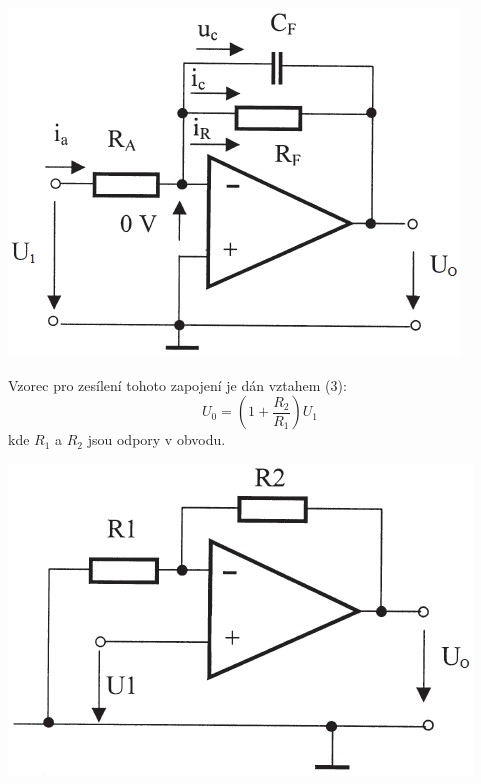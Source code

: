 \documentclass[a4paper,11pt]{article}
\begin{document}
    \begin{minipage}[t]{0.5\textwidth} 
                \vspace{10pt}   
                \par \centering
                \includegraphics[scale=0.6]{low_scheme}
                \captionsetup{justification=centering, font=footnotesize}
                \label{fig:low_scheme}
                \vspace{10pt}
                \raggedright

                \par Vzorec pro zesílení tohoto zapojení je dán vztahem (3):
                \begin{equation}
                    U_0 = \left(1 + \frac{R_2}{R_1}\right) U_1
                \end{equation}
                kde $R_1$ a $R_2$ jsou odpory v obvodu.

                \vspace{10pt}   
                \par \centering
                \includegraphics[scale=0.6]{non_inv_scheme}
                \captionsetup{justification=centering, font=footnotesize}
                \label{fig:non_inv_scheme}
                \vspace{10pt}
                \raggedright


\end{minipage}
\end{document}
